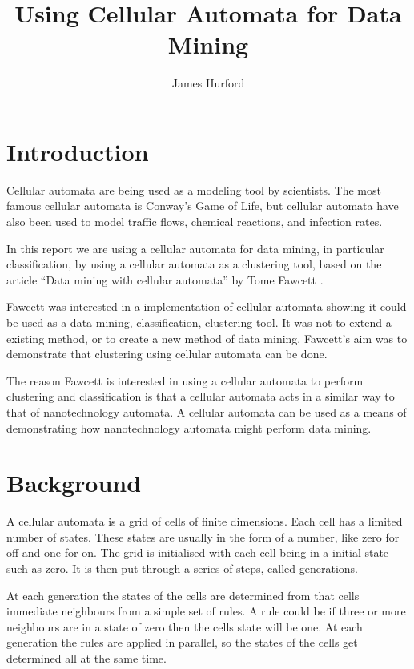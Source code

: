 \documentclass[11pt]{article}
\title{Using Cellular Automata for Data Mining}
\author{James Hurford}
\date{}
\begin{document}
\maketitle

\setcounter{tocdepth}{3}
\tableofcontents
\vspace*{1cm}




\section{Introduction}
\label{sec-1}


  Cellular automata are being used as a modeling tool by
  scientists. The most famous cellular automata is Conway's Game of
  Life, but cellular automata have also been used to model traffic
  flows, chemical reactions, and infection rates.

  In this report we are using a cellular automata for data mining, in
  particular classification, by using a cellular automata as a
  clustering tool, based on the article ``Data mining with cellular
  automata'' by Tome Fawcett \cite{fawcett08}.

  Fawcett \cite{fawcett08} was interested in a implementation of
  cellular automata showing it could be used as a data mining,
  classification, clustering tool.  It was not to extend a existing
  method, or to create a new method of data mining. Fawcett's
  \cite{fawcett08} aim was to demonstrate that clustering using
  cellular automata can be done.

  The reason Fawcett \cite{fawcett08} is interested in using a
  cellular automata to perform clustering and classification is that a
  cellular automata acts in a similar way to that of nanotechnology
  automata. A cellular automata can be used as a means of
  demonstrating how nanotechnology automata might perform data mining.
\section{Background}
\label{sec-2}

  A cellular automata is a grid of cells of finite dimensions.  Each
  cell has a limited number of states.  These states are usually in
  the form of a number, like zero for off and one for on.  The grid is
  initialised with each cell being in a initial state such as zero.
  It is then put through a series of steps, called generations.

  At each generation the states of the cells are determined from that
  cells immediate neighbours from a simple set of rules.  A rule could
  be if three or more neighbours are in a state of zero then the cells
  state will be one.  At each generation the rules are applied in
  parallel, so the states of the cells get determined all at the same
  time.
\end{document}
